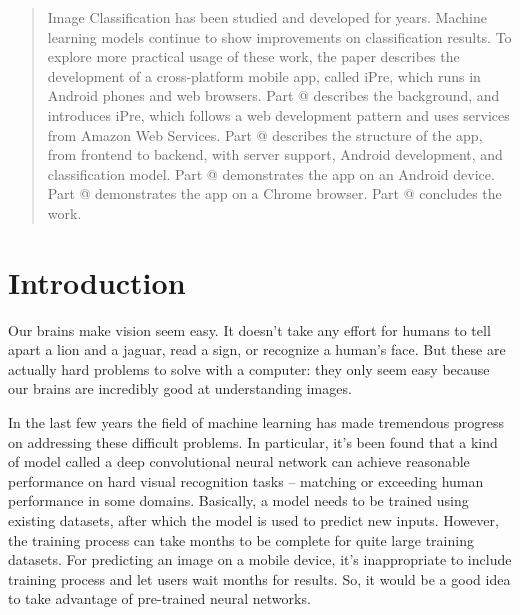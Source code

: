 \documentclass[conference]{IEEEtran}
\makeatletter
\newcommand*{\rom}[1]{\expandafter\@slowromancap\romannumeral #1@}
\makeatother
\begin{document}
\begin{abstract}
Image Classification has been studied and developed for years. Machine learning models continue to show improvements on classification results. To explore more practical usage of these work, the paper describes the development of a cross-platform mobile app, called iPre, which runs in Android phones and web browsers. Part \rom{1} describes the background, and introduces iPre, which follows a web development pattern and uses services from Amazon Web Services. Part \rom{2} describes the structure of the app, from frontend to backend, with server support, Android development, and classification model. Part \rom{3} demonstrates the app on an Android device. Part \rom{4} demonstrates the app on a Chrome browser. Part \rom{5} concludes the work.
\end{abstract}





%
\IEEEpeerreviewmaketitle



\section{Introduction}
Our brains make vision seem easy. It doesn't take any effort for humans to tell apart a lion and a jaguar, read a sign, or recognize a human's face. But these are actually hard problems to solve with a computer: they only seem easy because our brains are incredibly good at understanding images.

In the last few years the field of machine learning has made tremendous progress on addressing these difficult problems. In particular, it's been found that a kind of model called a deep convolutional neural network can achieve reasonable performance on hard visual recognition tasks -- matching or exceeding human performance in some domains. Basically, a model needs to be trained using existing datasets, after which the model is used to predict new inputs. However, the training process can take months to be complete for quite large training datasets. For predicting an image on a mobile device, it's inappropriate to include training process and let users wait months for results. So, it would be a good idea to take advantage of pre-trained neural networks.
\end{document}
